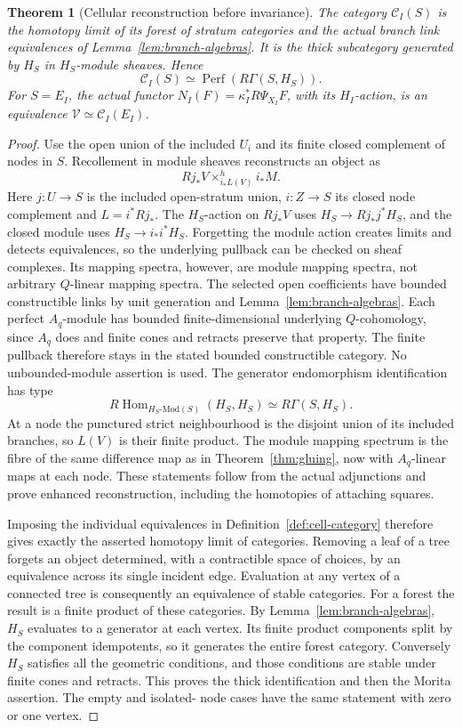 \documentclass[11pt]{article}
\newtheorem{theorem}{Theorem}[section]
\theoremstyle{definition}
\theoremstyle{remark}
\newcommand{\Perf}{\operatorname{Perf}}
\newcommand{\RHom}{R\operatorname{Hom}}
\begin{document}
\begin{theorem}[Cellular reconstruction before invariance]
\label{thm:cell-reconstruction}
The category $\mathcal C_I(S)$ is the homotopy limit of its forest of
stratum categories and the actual branch link equivalences of
Lemma~\ref{lem:branch-algebras}.  It is the thick subcategory generated
by $H_S$ in $H_S$-module sheaves.  Hence
\[
 \mathcal C_I(S)\simeq\Perf(R\Gamma(S,H_S)).
\]
For $S=E_I$, the actual functor
$N_I(F)=\kappa_I^*R\Psi_{X_I}F$, with its $H_I$-action, is an
equivalence $\mathcal V\simeq\mathcal C_I(E_I)$.
\end{theorem}
\begin{proof}
Use the open union of the included $U_i$ and its finite closed
complement of nodes in $S$.  Recollement in module sheaves reconstructs
an object as
\[
 Rj_*V\mathop{\times}^{h}_{i_*L(V)}i_*M.
\]
Here $j:U\to S$ is the included open-stratum union, $i:Z\to S$
its closed node complement and $L=i^*Rj_*$.  The $H_S$-action on
$Rj_*V$ uses $H_S\to Rj_*j^*H_S$, and the closed module uses
$H_S\to i_*i^*H_S$.  Forgetting the module action creates limits
and detects equivalences, so the underlying pullback can be checked
on sheaf complexes.  Its mapping spectra, however, are module mapping
spectra, not arbitrary $Q$-linear mapping spectra.
The selected open coefficients have bounded constructible links by
unit generation and Lemma~\ref{lem:branch-algebras}.  Each perfect
$A_q$-module has bounded finite-dimensional underlying $Q$-cohomology,
since $A_q$ does and finite cones and retracts preserve that property.
The finite pullback therefore stays in the stated bounded
constructible category.  No unbounded-module assertion is used.
The generator endomorphism identification has type
\[
 \RHom_{H_S\text{-}\mathrm{Mod}(S)}(H_S,H_S)
        \simeq R\Gamma(S,H_S).
\]  At a node the
punctured strict neighbourhood is the disjoint union of its included
branches, so $L(V)$ is their finite product.  The module mapping
spectrum is the fibre of the same difference map as in
Theorem~\ref{thm:gluing}, now with $A_q$-linear maps at each node.
These statements follow from the actual adjunctions and prove enhanced
reconstruction, including the homotopies of attaching squares.

Imposing the individual equivalences in Definition~\ref{def:cell-category}
therefore gives exactly the asserted homotopy limit of categories.
Removing a leaf of a tree forgets an object determined, with a
contractible space of choices, by an equivalence across its single
incident edge.  Evaluation at any vertex of a connected tree is
consequently an equivalence of stable categories.  For a forest the
result is a finite product of these categories.  By
Lemma~\ref{lem:branch-algebras}, $H_S$ evaluates to a generator at
each vertex.  Its finite product components split by the component
idempotents, so it generates the entire forest category.  Conversely
$H_S$ satisfies all the geometric conditions, and those conditions
are stable under finite cones and retracts.  This proves the thick
identification and then the Morita assertion.  The empty and isolated-
node cases have the same statement with zero or one vertex.


\end{proof}
\end{document}

